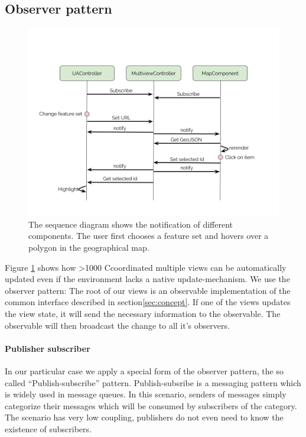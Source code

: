 \documentclass{article}
\newcommand\hmm[1]{\ifnum\ifhmode\spacefactor\else2000\fi>1000 \uppercase{#1}\else#1\fi}
\newcommand{\cmvs}{\hmm{c}oordinated multiple views}
\begin{document}
\subsection{Observer pattern}
\begin{figure}[h!]
  \centering
  \includegraphics[width=\textwidth]{images/sequence-diagram.png}
  \caption{The sequence diagram shows the notification of different components.
  The user first chooses a feature set and hovers over a polygon in the geographical map.}
  \label{fig:implementation:sequence-diagram}
\end{figure}


Figure \ref{fig:implementation:sequence-diagram} shows how \cmvs{} can be automatically updated even if the environment lacks a native update-mechanism.
We use the observer pattern:
The root of our views is an observable implementation of the common interface described in section\ref{sec:concept}.
If one of the views updates the view state, it will send the necessary information to the observable.
The observable will then broadcast the change to all it's observers.


\paragraph{Publisher subscriber}
In our particular case we apply a special form of the observer pattern, the so called ``Publish-subscribe'' pattern\cite{Eugster2003}.
Publish-subsribe is a messaging pattern which is widely used in message queues.
In this scenario, senders of messages simply categorize their messages which will be consumed by subscribers of the category.
The scenario has very low coupling, publishers do not even need to know the existence of subscribers.
\end{document}
